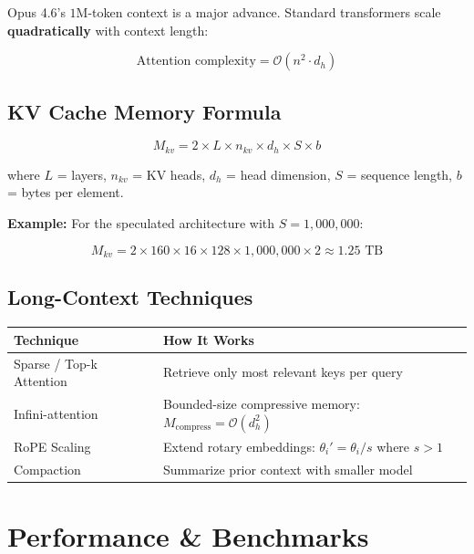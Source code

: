 \documentclass[11pt,a4paper]{article}
\begin{document}
Opus 4.6's $1\text{M}$-token context is a major advance. Standard transformers scale \textbf{quadratically} with context length:

$$\text{Attention complexity} = \mathcal{O}(n^2 \cdot d_h)$$

\subsection{KV Cache Memory Formula}

$$M_{kv} = 2 \times L \times n_{kv} \times d_h \times S \times b$$

where $L$ = layers, $n_{kv}$ = KV heads, $d_h$ = head dimension, $S$ = sequence length, $b$ = bytes per element.

\textbf{Example:} For the speculated architecture with $S = 1{,}000{,}000$:

$$M_{kv} = 2 \times 160 \times 16 \times 128 \times 1{,}000{,}000 \times 2 \approx 1.25 \text{ TB}$$

\subsection{Long-Context Techniques}

\begin{center}
\begin{tabular}{L{4cm}L{10cm}}
\toprule
\textbf{Technique} & \textbf{How It Works} \\
\midrule
Sparse / Top-k Attention & Retrieve only most relevant keys per query \\
Infini-attention & Bounded-size compressive memory: $M_{\text{compress}} = \mathcal{O}(d_h^2)$ \\
RoPE Scaling & Extend rotary embeddings: $\theta_i' = \theta_i / s$ where $s > 1$ \\
Compaction & Summarize prior context with smaller model \\
\bottomrule
\end{tabular}
\end{center}

\section{Performance \& Benchmarks}
\end{document}

